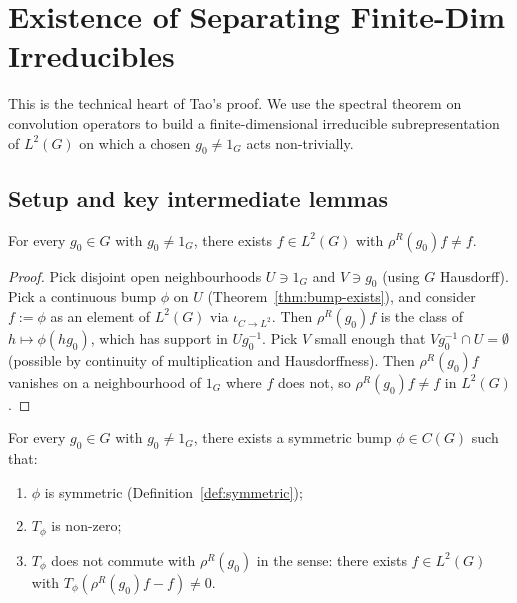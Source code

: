 \chapter{Existence of Separating Finite-Dim Irreducibles}
\label{chap:separating}

This is the technical heart of Tao's proof. We use the spectral theorem
on convolution operators to build a finite-dimensional irreducible
subrepresentation of $L^2(G)$ on which a chosen $g_0 \neq 1_G$ acts
non-trivially.

\section{Setup and key intermediate lemmas}

\begin{theorem}
  \label{thm:rightReg-faithful}
  For every $g_0 \in G$ with $g_0 \neq 1_G$, there exists $f \in L^2(G)$
  with $\rho^R(g_0) f \neq f$.
\end{theorem}

\begin{proof}
  Pick disjoint open neighbourhoods $U \ni 1_G$ and $V \ni g_0$ (using
  $G$ Hausdorff). Pick a continuous bump $\phi$ on $U$
  (Theorem~\ref{thm:bump-exists}), and consider
  $f := \phi$ as an element of $L^2(G)$ via $\iota_{C\to L^2}$.
  Then $\rho^R(g_0) f$ is the class of $h \mapsto \phi(h g_0)$, which has
  support in $U g_0^{-1}$. Pick $V$ small enough that
  $V g_0^{-1} \cap U = \emptyset$ (possible by continuity of multiplication
  and Hausdorffness). Then $\rho^R(g_0) f$ vanishes on a neighbourhood of
  $1_G$ where $f$ does not, so $\rho^R(g_0) f \neq f$ in $L^2(G)$.
\end{proof}

\begin{theorem}
  \label{thm:existsSepConv}
  For every $g_0 \in G$ with $g_0 \neq 1_G$, there exists a symmetric
  bump $\phi \in C(G)$ such that:
  \begin{enumerate}
    \item $\phi$ is symmetric (Definition~\ref{def:symmetric});
    \item $T_\phi$ is non-zero;
    \item $T_\phi$ does not commute with $\rho^R(g_0)$ in the sense:
      there exists $f \in L^2(G)$ with $T_\phi(\rho^R(g_0) f - f) \neq 0$.
  \end{enumerate}
\end{theorem}

